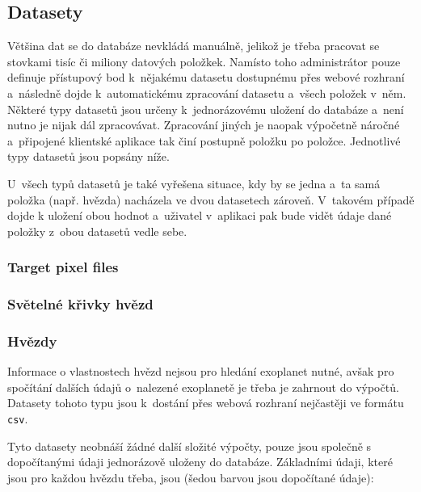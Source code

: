 \documentclass[a4paper,12pt]{article}
\def\code#1{\texttt{#1}}
\begin{document}
{{{{{{{{\subsection{Datasety}

Většina dat se do databáze nevkládá manuálně, jelikož je třeba pracovat se stovkami tisíc či miliony datových položkek. Namísto toho administrátor pouze definuje přístupový bod k~nějakému datasetu dostupnému přes webové rozhraní a~následně dojde k~automatickému zpracování datasetu a~všech položek v~něm. Některé typy datasetů jsou určeny k~jednorázovému uložení do databáze a~není nutno je nijak dál zpracovávat. Zpracování jiných je naopak výpočetně náročné a~připojené klientské aplikace tak činí postupně položku po položce. Jednotlivé typy datasetů jsou popsány níže.

U~všech typů datasetů je také vyřešena situace, kdy by se jedna a~ta samá položka (např. hvězda) nacházela ve dvou datasetech zároveň. V~takovém případě dojde k uložení obou hodnot a~uživatel v~aplikaci pak bude vidět údaje dané položky z~obou datasetů vedle sebe.

\subsubsection{Target pixel files}

\subsubsection{Světelné křivky hvězd}

\subsubsection{Hvězdy}

Informace o vlastnostech hvězd nejsou pro hledání exoplanet nutné, avšak pro spočítání dalších údajů o~nalezené exoplanetě je třeba je zahrnout do výpočtů. Datasety tohoto typu jsou k~dostání přes webová rozhraní nejčastěji ve formátu \code{csv}.


Tyto datasety neobnáší žádné další složité výpočty, pouze jsou společně s dopočítanými údaji jednorázově uloženy do databáze. Základními údaji, které jsou pro každou hvězdu třeba, jsou (šedou barvou jsou dopočítané údaje):


}}}}}}}}
\end{document}
